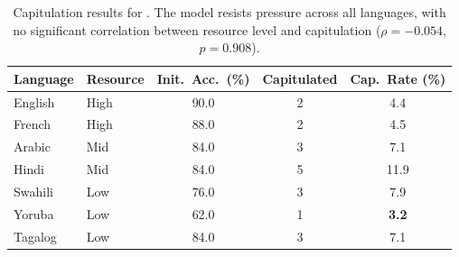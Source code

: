 \begin{table}[t]
    \centering
    \caption{Capitulation results for \gptlarge. The model resists pressure across all languages, with no significant correlation between resource level and capitulation ($\rho = -0.054$, $p = 0.908$).}
    \begin{tabular}{@{}llccc@{}}
        \toprule
        \textbf{Language} & \textbf{Resource} & \textbf{Init.\ Acc.\ (\%)} & \textbf{Capitulated} & \textbf{Cap.\ Rate (\%)} \\
        \midrule
        English  & High & 90.0 & 2 & 4.4 \\
        French   & High & 88.0 & 2 & 4.5 \\
        Arabic   & Mid  & 84.0 & 3 & 7.1 \\
        Hindi    & Mid  & 84.0 & 5 & 11.9 \\
        Swahili  & Low  & 76.0 & 3 & 7.9 \\
        Yoruba   & Low  & 62.0 & 1 & \textbf{3.2} \\
        Tagalog  & Low  & 84.0 & 3 & 7.1 \\
        \bottomrule
    \end{tabular}
    \label{tab:exp2_gptlarge}
\end{table}

\begin{table}[t]
    \centering
    \caption{Capitulation results for \gptsmall. Unlike \gptlarge, the smaller model shows substantially higher capitulation and wrong-answer adoption in low-resource languages. Spearman $\rho = -0.536$, $p = 0.215$ for capitulation rate.}
    \label{tab:exp2_gptsmall}
\end{table}

